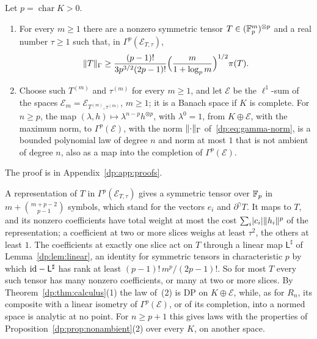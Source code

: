 \begin{proposition}\label{dp:prop:degree-p}
Let $p=\operatorname{char}K>0$.
\begin{enumerate}
\item For every $m\ge1$ there are a nonzero symmetric tensor $T\in(\mathbb F_p^m)^{\otimes p}$ and a real number $\tau\ge1$ such that, in $\Gamma^p(\mathcal E_{T,\tau})$,
\begin{equation}\label{dp:eq:degree-p-ratio}
 \lVert T\rVert_\Gamma\ge\frac{(p-1)!}{3p^{3/2}(2p-1)!}\Bigl(\frac m{1+\log_pm}\Bigr)^{1/2}\pi(T).
\end{equation}
\item Choose such $T^{(m)}$ and $\tau^{(m)}$ for every $m\ge1$, and let $\mathcal E$ be the $\ell^1$-sum of the spaces $\mathcal E_m=\mathcal E_{T^{(m)},\tau^{(m)}}$, $m\ge1$; it is a Banach space if $K$ is complete. For $n\ge p$, the map $(\lambda,h)\mapsto\lambda^{n-p}h^{\otimes p}$, with $\lambda^0=1$, from $K\oplus\mathcal E$, with the maximum norm, to $\Gamma^p(\mathcal E)$, with the norm $\lVert \cdot\rVert_\Gamma$ of~\eqref{dp:eq:gamma-norm}, is a bounded polynomial law of degree $n$ and norm at most $1$ that is not ambient of degree $n$, also as a map into the completion of $\Gamma^p(\mathcal E)$.
\end{enumerate}
\end{proposition}
The proof is in Appendix~\ref{dp:app:proofs}.

A representation of $T$ in $\Gamma^p(\mathcal E_{T,\tau})$ gives a symmetric tensor over $\mathbb F_p$ in $m+\binom{m+p-2}{p-1}$ symbols, which stand for the vectors $e_i$ and $\partial^\gamma T$. It maps to $T$, and its nonzero coefficients have total weight at most the cost $\sum_i\lvert c_i\rvert\lVert h_i\rVert^p$ of the representation; a coefficient at two or more slices weighs at least $\tau^2$, the others at least $1$. The coefficients at exactly one slice act on $T$ through a linear map $\mathsf L^\sharp$ of Lemma~\ref{dp:lem:linear}, an identity for symmetric tensors in characteristic $p$ by which $\mathrm{id}-\mathsf L^\sharp$ has rank at least $(p-1)!\,m^p/(2p-1)!$. So for most $T$ every such tensor has many nonzero coefficients, or many at two or more slices. By Theorem~\ref{dp:thm:calculus}(1) the law of~(2) is DP on $K\oplus\mathcal E$, while, as for $R_n$, its composite with a linear isometry of $\Gamma^p(\mathcal E)$, or of its completion, into a normed space is analytic at no point. For $n\ge p+1$ this gives laws with the properties of Proposition~\ref{dp:prop:nonambient}(2) over every $K$, on another space.

